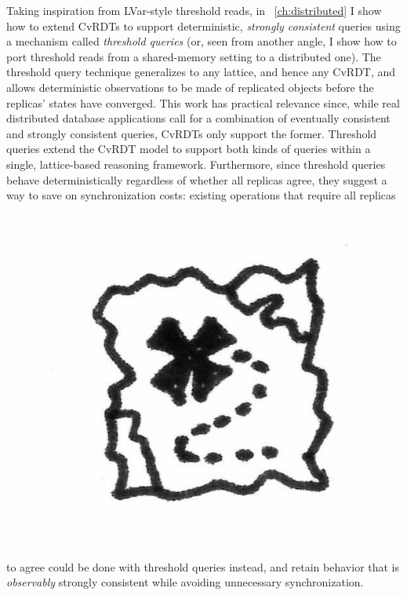 Taking inspiration from LVar-style threshold reads, in
~\ref{ch:distributed} I show how to extend CvRDTs to support
deterministic, \emph{strongly consistent} queries using a mechanism
called \emph{threshold queries} (or, seen from another angle, I show
how to port threshold reads from a shared-memory setting to a
distributed one).  The threshold query technique generalizes to any
lattice, and hence any CvRDT, and allows deterministic observations to
be made of replicated objects before the replicas' states have
converged.  This work has practical relevance since, while real
distributed database applications call for a combination of eventually
consistent and strongly consistent queries, CvRDTs only support the
former.  Threshold queries extend the CvRDT model to support both
kinds of queries within a single, lattice-based reasoning framework.
Furthermore, since threshold queries behave deterministically
regardless of whether all replicas agree, they suggest a way to save
on synchronization costs: existing operations that require all
replicas
\begin{figure}
  \vspace{-2em}
  \begin{center}
    \includegraphics[scale=0.18]{../illustrations/map}
  \end{center}
  \vspace{-3em}
\end{figure}
to agree could be done with threshold queries instead, and
retain behavior that is \emph{observably} strongly consistent while
avoiding unnecessary synchronization.
\fi

